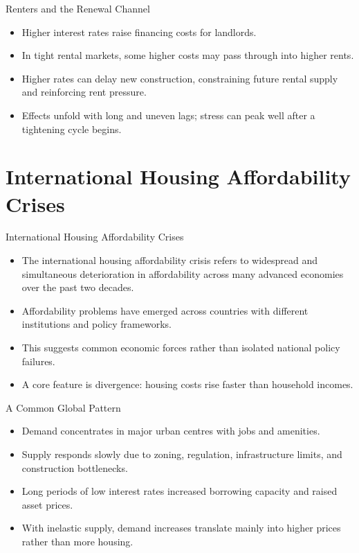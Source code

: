 \documentclass[aspectratio=169]{beamer}
\begin{document}
\begin{frame}{Renters and the Renewal Channel}
\transfade
\begin{itemize}
  \item Higher interest rates raise financing costs for landlords.
  \item In tight rental markets, some higher costs may pass through into higher rents.
  \item Higher rates can delay new construction, constraining future rental supply and reinforcing rent pressure.
  \item Effects unfold with long and uneven lags; stress can peak well after a tightening cycle begins.
\end{itemize}
\end{frame}

\section{International Housing Affordability Crises}

\begin{frame}{International Housing Affordability Crises}
\transfade
\begin{itemize}
  \item The international housing affordability crisis refers to widespread and simultaneous deterioration in affordability across many advanced economies over the past two decades.
  \item Affordability problems have emerged across countries with different institutions and policy frameworks.
  \item This suggests common economic forces rather than isolated national policy failures.
  \item A core feature is divergence: housing costs rise faster than household incomes.
\end{itemize}
\end{frame}

\begin{frame}{A Common Global Pattern}
\transfade
\begin{itemize}
  \item Demand concentrates in major urban centres with jobs and amenities.
  \item Supply responds slowly due to zoning, regulation, infrastructure limits, and construction bottlenecks.
  \item Long periods of low interest rates increased borrowing capacity and raised asset prices.
  \item With inelastic supply, demand increases translate mainly into higher prices rather than more housing.
\end{itemize}
\end{frame}
\end{document}
